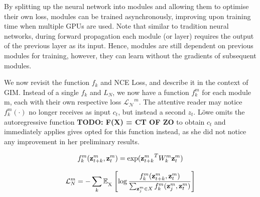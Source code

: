 By splitting up the neural network into modules and allowing them to optimise their own loss, modules can be trained asynchronously, improving upon training time when multiple GPUs are used. Note that similar to tradition neural networks, during forward propagation each module (or layer) requires the output of the previous layer as its input. Hence, modules are still dependent on previous modules for training, however, they can learn without the gradients of subsequent modules.

	
	We now revisit the function $f_k$ and NCE Loss, and describe it in the context of GIM. Instead of a single $f_k$ and $L_N$, we now have a function $f_k^m$ for each module m, each with their own respective loss $\mathcal{L_N}^m$. The attentive reader may notice $f_k^m( \cdot )$ no longer receives as input $c_t$, but instead a second $z_t$. Löwe omits the autoregressive function \textbf{TODO: F(X) = CT OF ZO} to obtain $c_t$ and immediately applies  gives opted for this function instead, as she did not notice any improvement in her preliminary results.
	
	$$
	f_k^m(\mathbf{z}_{t+k}^m,\mathbf{z}_t^m) = \exp({\mathbf{z}_{t+k}^m}^TW_k^m\mathbf{z}_t^m)
	$$
	
	$$
	\mathcal{L}_N^m = -\sum_{k} \mathbb{E}_{\textsubscript{X}} \left[\log \frac{f_k^m(\mathbf{z}_{t+k}^m,\mathbf{z}_t^m) }{\sum_{\mathbf{z}_j^m \in X} f_k^m(\mathbf{z}_j^m, \mathbf{z}_t^m)} \right]
	$$
















%
%
%



